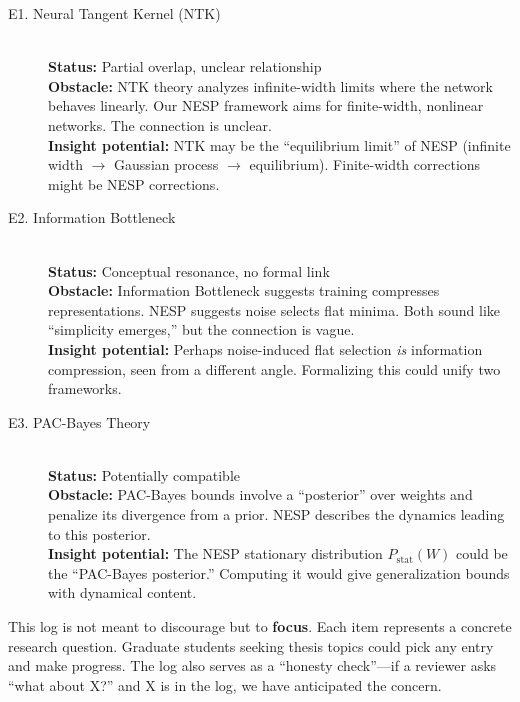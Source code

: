 \documentclass[
  journal=largetwo,
  year=2025,
  volume=37,
]{cup-journal}
\begin{document}
\begin{description}
    \item[E1. Neural Tangent Kernel (NTK)] \hfill \\
    \textbf{Status:} Partial overlap, unclear relationship \\
    \textbf{Obstacle:} NTK theory analyzes infinite-width limits where the network behaves linearly. Our NESP framework aims for finite-width, nonlinear networks. The connection is unclear. \\
    \textbf{Insight potential:} NTK may be the ``equilibrium limit'' of NESP (infinite width $\to$ Gaussian process $\to$ equilibrium). Finite-width corrections might be NESP corrections.
    
    \item[E2. Information Bottleneck] \hfill \\
    \textbf{Status:} Conceptual resonance, no formal link \\
    \textbf{Obstacle:} Information Bottleneck suggests training compresses representations. NESP suggests noise selects flat minima. Both sound like ``simplicity emerges,'' but the connection is vague. \\
    \textbf{Insight potential:} Perhaps noise-induced flat selection \textit{is} information compression, seen from a different angle. Formalizing this could unify two frameworks.
    
    \item[E3. PAC-Bayes Theory] \hfill \\
    \textbf{Status:} Potentially compatible \\
    \textbf{Obstacle:} PAC-Bayes bounds involve a ``posterior'' over weights and penalize its divergence from a prior. NESP describes the dynamics leading to this posterior. \\
    \textbf{Insight potential:} The NESP stationary distribution $P_{\text{stat}}(W)$ could be the ``PAC-Bayes posterior.'' Computing it would give generalization bounds with dynamical content.
\end{description}

\begin{remark}
This log is not meant to discourage but to \textbf{focus}. Each item represents a concrete research question. Graduate students seeking thesis topics could pick any entry and make progress. The log also serves as a ``honesty check''---if a reviewer asks ``what about X?'' and X is in the log, we have anticipated the concern.
\end{remark}
\end{document}
